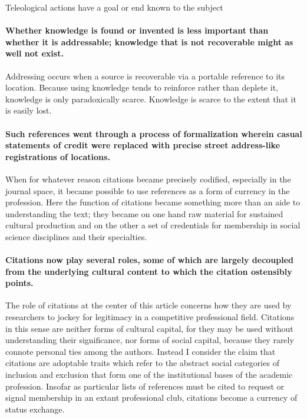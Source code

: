\documentclass[]{article}
\begin{document}
Teleological actions have a goal or end known to the subject

\paragraph{Whether knowledge is found or invented is less important than
whether it is addressable; knowledge that is not recoverable might as
well not
exist.}\label{whether-knowledge-is-found-or-invented-is-less-important-than-whether-it-is-addressable-knowledge-that-is-not-recoverable-might-as-well-not-exist.}

Addressing occurs when a source is recoverable via a portable reference
to its location. Because using knowledge tends to reinforce rather than
deplete it, knowledge is only paradoxically scarce. Knowledge is scarce
to the extent that it is easily lost.

\paragraph{Such references went through a process of formalization
wherein casual statements of credit were replaced with precise street
address-like registrations of
locations.}\label{such-references-went-through-a-process-of-formalization-wherein-casual-statements-of-credit-were-replaced-with-precise-street-address-like-registrations-of-locations.}

When for whatever reason citations became precisely codified, especially
in the journal space, it became possible to use references as a form of
currency in the profession. Here the function of citations became
something more than an aide to understanding the text; they became on
one hand raw material for sustained cultural production and on the other
a set of credentials for membership in social science disciplines and
their specialties.

\paragraph{Citations now play several roles, some of which are largely
decoupled from the underlying cultural content to which the citation
ostensibly
points.}\label{citations-now-play-several-roles-some-of-which-are-largely-decoupled-from-the-underlying-cultural-content-to-which-the-citation-ostensibly-points.}

The role of citations at the center of this article concerns how they
are used by researchers to jockey for legitimacy in a competitive
professional field. Citations in this sense are neither forms of
cultural capital, for they may be used without understanding their
significance, nor forms of social capital, because they rarely connote
personal ties among the authors. Instead I consider the claim that
citations are adoptable traits which refer to the abstract social
categories of inclusion and exclusion that form one of the institutional
bases of the academic profession. Insofar as particular lists of
references must be cited to request or signal membership in an extant
professional club, citations become a currency of status exchange.
\end{document}
